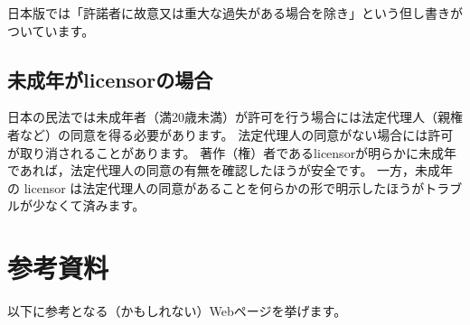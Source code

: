 \documentclass{ltjsarticle}
\begin{document}
日本版では「許諾者に故意又は重大な過失がある場合を除き」という但し書きがついています。


\subsection{未成年がlicensorの場合}

日本の民法では未成年者（満20歳未満）が許可を行う場合には法定代理人（親権者など）の同意を得る必要があります。
法定代理人の同意がない場合には許可が取り消されることがあります。
著作（権）者であるlicensorが明らかに未成年であれば，法定代理人の同意の有無を確認したほうが安全です。
一方，未成年の licensor は法定代理人の同意があることを何らかの形で明示したほうがトラブルが少なくて済みます。


\clearpage
\section*{参考資料}

以下に参考となる（かもしれない）Webページを挙げます。
\end{document}
